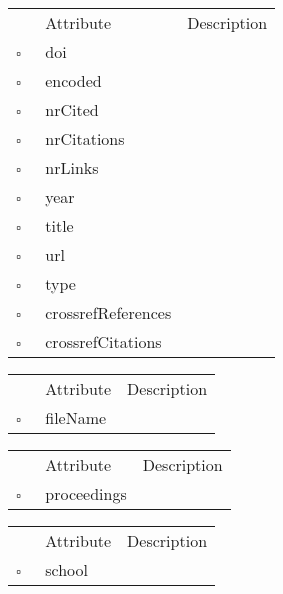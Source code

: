 \begin{table}
\caption{MissingWork  }

\begin{longtable}{llp{8cm}}
& Attribute & Description \\
$\square$\ & doi &  \\
$\square$\ & encoded &  \\
$\square$\ & nrCited &  \\
$\square$\ & nrCitations &  \\
$\square$\ & nrLinks &  \\
$\square$\ & year &  \\
$\square$\ & title &  \\
$\square$\ & url &  \\
$\square$\ & type &  \\
$\square$\ & crossrefReferences &  \\
$\square$\ & crossrefCitations &  \\
\end{longtable}
\label{attr:MissingWork}
\end{table}

\clearpage
\begin{table}
\caption{Orphan  }

\begin{longtable}{llp{8cm}}
& Attribute & Description \\
$\square$\ & fileName &  \\
\end{longtable}
\label{attr:Orphan}
\end{table}

\begin{table}
\caption{Paper  }

\begin{longtable}{llp{8cm}}
& Attribute & Description \\
$\square$\ & proceedings &  \\
\end{longtable}
\label{attr:Paper}
\end{table}

\begin{table}
\caption{PhDThesis  }

\begin{longtable}{llp{8cm}}
& Attribute & Description \\
$\square$\ & school &  \\
\end{longtable}
\label{attr:PhDThesis}
\end{table}

